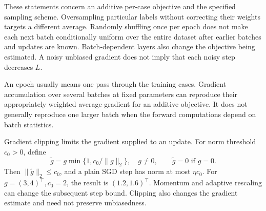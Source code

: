 These statements concern an additive per-case objective and the specified sampling scheme. Oversampling particular labels without correcting their weights targets a different average. Randomly shuffling once per epoch does not make each next batch conditionally uniform over the entire dataset after earlier batches and updates are known. Batch-dependent layers also change the objective being estimated. A noisy unbiased gradient does not imply that each noisy step decreases $L$.

\par\addvspace{\intextsep}\noindent\begin{minipage}{\linewidth}
\centering
{}
\label{fig:full-batch-vs-minibatch}
\end{minipage}\par\addvspace{\intextsep}

An epoch usually means one pass through the training cases. Gradient accumulation over several batches at fixed parameters can reproduce their appropriately weighted average gradient for an additive objective. It does not generally reproduce one larger batch when the forward computations depend on batch statistics.

Gradient clipping limits the gradient supplied to an update. For norm threshold $c_0>0$, define
\[
\tilde g=g\min\{1,c_0/\|g\|_2\},\quad g\ne0,
\qquad \tilde g=0\text{ if }g=0.
\]
Then $\|\tilde g\|_2\leq c_0$, and a plain SGD step has norm at most $\eta c_0$. For $g=(3,4)^\top,c_0=2$, the result is $(1.2,1.6)^\top$. Momentum and adaptive rescaling can change the subsequent step bound. Clipping also changes the gradient estimate and need not preserve unbiasedness.


